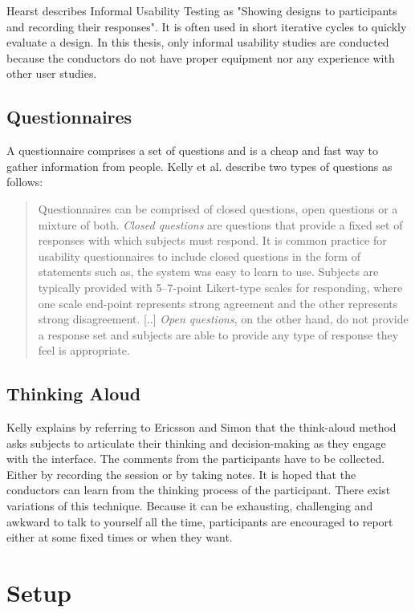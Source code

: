 \documentclass[11pt]{report}
\begin{document}
Hearst \cite{Hearst2009} describes Informal Usability Testing as "Showing designs to participants and recording their responses". It is often used in short iterative cycles to quickly evaluate a design. In this thesis, only informal usability studies are conducted because the conductors do not have proper equipment nor any experience with other user studies.

\subsection{Questionnaires}

A questionnaire comprises a set of questions and is a cheap and fast way to gather information from people. Kelly et al. \cite{Kelly2008} describe two types of questions as follows:

\begin{quote}
	Questionnaires can be comprised of closed questions, open questions or a mixture of both. \textit{Closed questions} are questions that provide a fixed set of responses with which subjects must respond. It is common practice for usability questionnaires to include closed questions in the form of statements such as, the system was easy to learn to use. Subjects are typically provided with 5–7-point Likert-type scales for responding, where one scale end-point represents strong agreement and the other represents strong disagreement. [..] \textit{Open questions}, on the other hand, do not provide a response set and subjects are able to provide any type of response they feel is appropriate. 
	\end{quote}


\subsection{Thinking Aloud}

Kelly \cite{Kelly2007} explains by referring to Ericsson and Simon \cite{Ericsson1993} that the think-aloud method asks subjects to articulate their thinking and decision-making as they engage with the interface. The comments from the participants have to be collected. Either by recording the session or by taking notes. It is hoped that the conductors can learn from the thinking process of the participant. There exist variations of this technique. Because it can be exhausting, challenging and awkward to talk to yourself all the time, participants are encouraged to report either at some fixed times or when they want.

\section{Setup}
\end{document}
